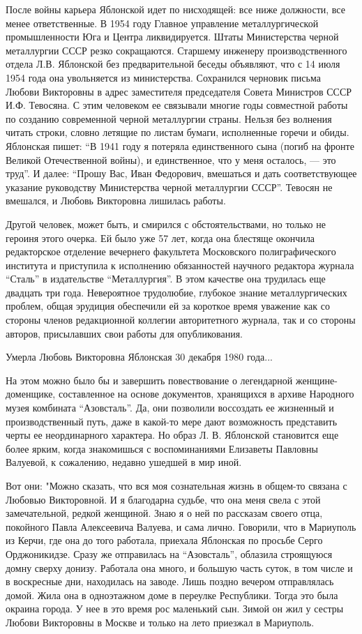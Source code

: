 После войны карьера Яблонской идет по нисходящей: все ниже должности, все менее
ответственные. В 1954 году Главное управление металлургической промышленности
Юга и Центра ликвидируется. Штаты Министерства черной металлургии СССР резко
сокращаются. Старшему инженеру производственного отдела Л.В. Яблонской без
предварительной беседы объявляют, что с 14 июля 1954 года она увольняется из
министерства. Сохранился черновик письма Любови Викторовны в адрес заместителя
председателя Совета Министров СССР И.Ф. Тевосяна. С этим человеком ее связывали
многие годы совместной работы по созданию современной черной металлургии
страны. Нельзя без волнения читать строки, словно летящие по листам бумаги,
исполненные горечи и обиды. Яблонская пишет: \enquote{В 1941 году я потеряла
единственного сына (погиб на фронте Великой Отечественной войны), и
единственное, что у меня осталось, — это труд}. И далее: \enquote{Прошу Вас, Иван
Федорович, вмешаться и дать соответствующее указание руководству Министерства
черной металлургии СССР}. Тевосян не вмешался, и Любовь Викторовна лишилась
работы.

Другой человек, может быть, и смирился с обстоятельствами, но только не героиня
этого очерка. Ей было уже 57 лет, когда она блестяще окончила редакторское
отделение вечернего факультета Московского полиграфического института и
приступила к исполнению обязанностей научного редактора журнала \enquote{Сталь} в
издательстве \enquote{Металлургия}. В этом качестве она трудилась еще двадцать три
года. Невероятное трудолюбие, глубокое знание металлургических проблем, общая
эрудиция обеспечили ей за короткое время уважение как со стороны членов
редакционной коллегии авторитетного журнала, так и со стороны авторов,
присылавших свои работы для опубликования.

Умерла Любовь Викторовна Яблонская 30 декабря 1980 года...

На этом можно было бы и завершить повествование о легендарной
женщине-доменщике, составленное на основе документов, хранящихся в архиве
Народного музея комбината \enquote{Азовсталь}. Да, они позволили воссоздать ее
жизненный и производственный путь, даже в какой-то мере дают возможность
представить черты ее неординарного характера. Но образ Л. В. Яблонской
становится еще более ярким, когда знакомишься с воспоминаниями Елизаветы
Павловны Валуевой, к сожалению, недавно ушедшей в мир иной.

Вот они: "Можно сказать, что вся моя сознательная жизнь в общем-то связана с
Любовью Викторовной. И я благодарна судьбе, что она меня свела с этой
замечательной, редкой женщиной. Знаю я о ней по рассказам своего отца,
покойного Павла Алексеевича Валуева, и сама лично. Говорили, что в Мариуполь из
Керчи, где она до того работала, приехала Яблонская по просьбе Серго
Орджоникидзе. Сразу же отправилась на \enquote{Азовсталь}, облазила строящуюся домну
сверху донизу. Работала она много, и большую часть суток, в том числе и в
воскресные дни, находилась на заводе. Лишь поздно вечером отправлялась домой.
Жила она в одноэтажном доме в переулке Республики. Тогда это была окраина
города. У нее в это время рос маленький сын. Зимой он жил у сестры Любови
Викторовны в Москве и только на лето приезжал в Мариуполь.

